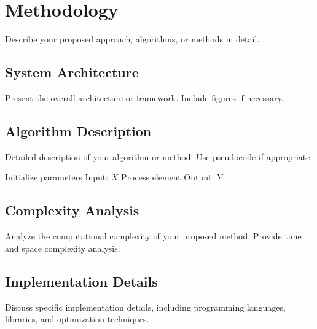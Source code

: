\section{Methodology}
\label{sec:methodology}

Describe your proposed approach, algorithms, or methods in detail.

\subsection{System Architecture}
\label{subsec:architecture}

Present the overall architecture or framework. Include figures if necessary.

\subsection{Algorithm Description}
\label{subsec:algorithm}

Detailed description of your algorithm or method. Use pseudocode if appropriate.

\begin{algorithm}[H]
\caption{Algorithm Name}
\label{alg:algorithm}
\begin{algorithmic}[1]
\STATE Initialize parameters
\STATE Input: $X$
    \STATE Process element
\ENDFOR
\STATE Output: $Y$
\end{algorithmic}
\end{algorithm}

\subsection{Complexity Analysis}
\label{subsec:complexity}

Analyze the computational complexity of your proposed method. Provide time and space complexity analysis.

\subsection{Implementation Details}
\label{subsec:implementation}

Discuss specific implementation details, including programming languages, libraries, and optimization techniques.
